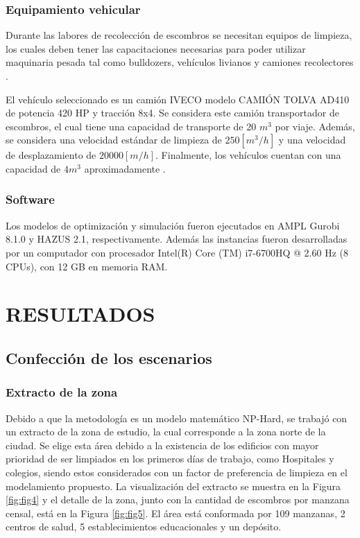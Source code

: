 \documentclass[letterpaper,conference]{IEEEtran}
\begin{document}
\subsubsection{Equipamiento vehicular}

Durante las labores de recolección de escombros se necesitan equipos de limpieza, los cuales deben tener las capacitaciones necesarias para poder utilizar maquinaria pesada tal como bulldozers, vehículos livianos y camiones recolectores \citep{Kasaei2016}.

El vehículo seleccionado es un camión IVECO modelo CAMIÓN TOLVA AD410 de potencia 420 HP y tracción 8x4. Se considera este camión transportador de escombros, el cual tiene una capacidad de transporte de 20 $m^3$ por viaje. Además, se considera una velocidad estándar de limpieza de $250 [m^{3}/h]$ \citep{Feng2003} y una velocidad de desplazamiento de $20000 [m/h]$. Finalmente, los vehículos cuentan con una capacidad de $4 m^{3}$ aproximadamente \citep{CAT}.

\subsubsection{Software}

Los modelos de optimización y simulación fueron ejecutados en AMPL Gurobi 8.1.0 y HAZUS 2.1, respectivamente. Además las instancias fueron desarrolladas por un computador con procesador Intel(R) Core (TM) i7-6700HQ @ 2.60 Hz (8 CPUs), con 12 GB en memoria RAM.

\section{RESULTADOS}

\subsection{Confección de los escenarios}

\subsubsection{Extracto de la zona}

Debido a que la metodología es un modelo matemático NP-Hard, se trabajó con un extracto de la zona de estudio, la cual corresponde a la zona norte de la ciudad. Se elige esta área debido a la  existencia de los edificios con mayor prioridad de ser limpiados en los primeros días de trabajo, como Hospitales y colegios, siendo estos considerados con un factor de preferencia de limpieza en el modelamiento propuesto.
La visualización del extracto se muestra en la Figura \ref{fig:fig4} y el detalle de la zona, junto con la cantidad de escombros por manzana censal, está en la Figura \ref{fig:fig5}. El área está conformada por 109 manzanas, 2 centros de salud, 5 establecimientos educacionales y un depósito.
\end{document}
